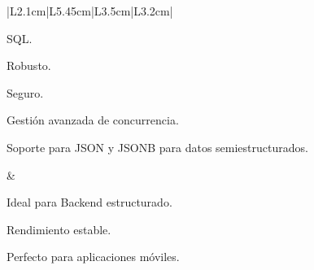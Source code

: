 {\begin{longtable}{|L{2.1cm}|L{5.45cm}|L{3.5cm}|L{3.2cm}|}
\begin{tablista}
  \item SQL.
  \item Robusto.
  \item Seguro.
  \item Gestión avanzada de concurrencia.
  \item Soporte para JSON y JSONB para datos semiestructurados.
\end{tablista} &
\begin{tablista}
  \item Ideal para Backend estructurado.
  \item Rendimiento estable.
  \item Perfecto para aplicaciones móviles.
\end{tablista} \\ \hline
\caption[Comparación de bases de datos para aplicaciones móviles]{Comparación de bases de datos para aplicaciones móviles. \textit{Fuente:} Elaboración propia a partir de Huang (2020), MongoDB, Inc. (2024) y Oracle Corporation (2024).}\label{tab:bases-datos}\\
\end{longtable}
}

